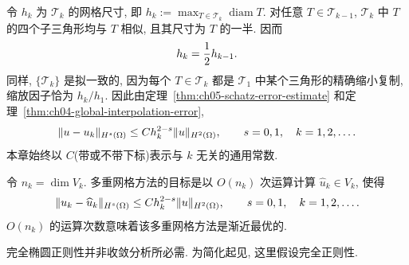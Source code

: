 令 $h_k$ 为 $\mathcal T_k$ 的网格尺寸, 即 $h_k:=\max_{T\in\mathcal T_k}\operatorname{diam}T$. 对任意 $T\in\mathcal T_{k-1}$, $\mathcal T_k$ 中 $T$ 的四个子三角形均与 $T$ 相似, 且其尺寸为 $T$ 的一半. 因而
\begin{equation}
\MathBookFormulaID{formula-ch06-mesh-size-halving}
\label{eq:ch06-mesh-size-halving}
h_k=\frac12h_{k-1}.
\end{equation}
同样, $\{\mathcal T_k\}$ 是拟一致的, 因为每个 $T\in\mathcal T_k$ 都是 $\mathcal T_1$ 中某个三角形的精确缩小复制, 缩放因子恰为 $h_k/h_1$. 因此由定理~\ref{thm:ch05-schatz-error-estimate} 和定理~\ref{thm:ch04-global-interpolation-error},
\begin{equation}
\MathBookFormulaID{formula-ch06-standard-finite-element-error}
\label{eq:ch06-standard-finite-element-error}
\|u-u_k\|_{H^s(\Omega)}\leq C h_k^{2-s}\|u\|_{H^2(\Omega)},
\qquad s=0,1,\quad k=1,2,\ldots.
\end{equation}
本章始终以 $C$(带或不带下标)表示与 $k$ 无关的通用常数.

令 $n_k=\dim V_k$. 多重网格方法的目标是以 $O(n_k)$ 次运算计算 $\widehat u_k\in V_k$, 使得
\begin{equation}
\MathBookFormulaID{formula-ch06-optimal-multigrid-target}
\label{eq:ch06-optimal-multigrid-target}
\|u_k-\widehat u_k\|_{H^s(\Omega)}
\leq C h_k^{2-s}\|u\|_{H^2(\Omega)},
\qquad s=0,1,\quad k=1,2,\ldots.
\end{equation}
$O(n_k)$ 的运算次数意味着该多重网格方法是渐近最优的.

\begin{Remark}
\label{rem:ch06-full-regularity-not-essential}
完全椭圆正则性并非收敛分析所必需. 为简化起见, 这里假设完全正则性.
\end{Remark}
